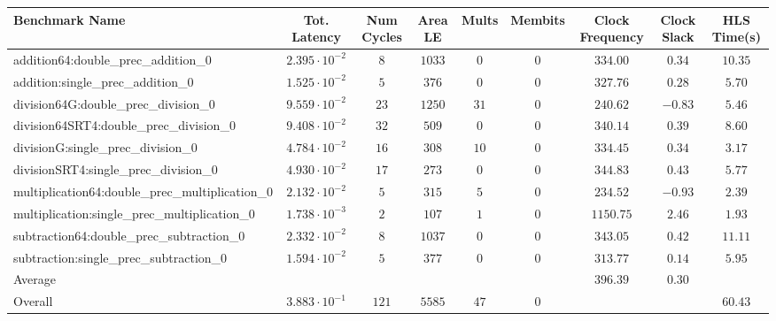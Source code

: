 \begin{tabular}{|l|c|c|c|c|c|c|c|c|}
\hline
Benchmark Name                                   & Tot. Latency            & Num Cycles & Area LE  & Mults  & Membits & Clock Frequency & Clock Slack & HLS Time(s) \\
\hline
addition64:double\_prec\_addition\_0             & $ 2.395 \cdot 10^{-2} $ & $ 8      $ & $ 1033 $ & $ 0  $ & $ 0   $ & $ 334.00      $ & $ 0.34    $ & $ 10.35   $ \\
addition:single\_prec\_addition\_0               & $ 1.525 \cdot 10^{-2} $ & $ 5      $ & $ 376  $ & $ 0  $ & $ 0   $ & $ 327.76      $ & $ 0.28    $ & $ 5.70    $ \\
division64G:double\_prec\_division\_0            & $ 9.559 \cdot 10^{-2} $ & $ 23     $ & $ 1250 $ & $ 31 $ & $ 0   $ & $ 240.62      $ & $ -0.83   $ & $ 5.46    $ \\
division64SRT4:double\_prec\_division\_0         & $ 9.408 \cdot 10^{-2} $ & $ 32     $ & $ 509  $ & $ 0  $ & $ 0   $ & $ 340.14      $ & $ 0.39    $ & $ 8.60    $ \\
divisionG:single\_prec\_division\_0              & $ 4.784 \cdot 10^{-2} $ & $ 16     $ & $ 308  $ & $ 10 $ & $ 0   $ & $ 334.45      $ & $ 0.34    $ & $ 3.17    $ \\
divisionSRT4:single\_prec\_division\_0           & $ 4.930 \cdot 10^{-2} $ & $ 17     $ & $ 273  $ & $ 0  $ & $ 0   $ & $ 344.83      $ & $ 0.43    $ & $ 5.77    $ \\
multiplication64:double\_prec\_multiplication\_0 & $ 2.132 \cdot 10^{-2} $ & $ 5      $ & $ 315  $ & $ 5  $ & $ 0   $ & $ 234.52      $ & $ -0.93   $ & $ 2.39    $ \\
multiplication:single\_prec\_multiplication\_0   & $ 1.738 \cdot 10^{-3} $ & $ 2      $ & $ 107  $ & $ 1  $ & $ 0   $ & $ 1150.75     $ & $ 2.46    $ & $ 1.93    $ \\
subtraction64:double\_prec\_subtraction\_0       & $ 2.332 \cdot 10^{-2} $ & $ 8      $ & $ 1037 $ & $ 0  $ & $ 0   $ & $ 343.05      $ & $ 0.42    $ & $ 11.11   $ \\
subtraction:single\_prec\_subtraction\_0         & $ 1.594 \cdot 10^{-2} $ & $ 5      $ & $ 377  $ & $ 0  $ & $ 0   $ & $ 313.77      $ & $ 0.14    $ & $ 5.95    $ \\
\hline
Average                                          & $                     $ & $        $ & $      $ & $    $ & $     $ & $ 396.39      $ & $ 0.30    $ & $         $ \\
\hline
Overall                                          & $ 3.883 \cdot 10^{-1} $ & $ 121    $ & $ 5585 $ & $ 47 $ & $ 0   $ & $             $ & $         $ & $ 60.43   $ \\
\hline
\end{tabular}
